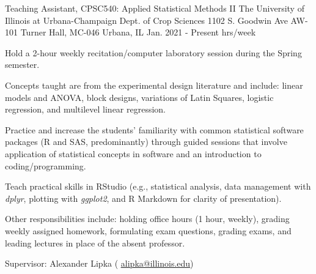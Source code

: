 \begin{cventries}
  \cventry
    {Teaching Assistant, CPSC540: Applied Statistical Methods II} %
    {The University of Illinois at Urbana-Champaign \newline Dept. of Crop Sciences } %
    {1102 S. Goodwin Ave \newline AW-101 Turner Hall, MC-046
    Urbana, IL} %
    {Jan. 2021 - Present  hrs/week} %
    {
      \begin{cvitems} %
        \item {Hold a 2-hour weekly recitation/computer laboratory session during the Spring semester. }
        \item{Concepts taught are from the experimental design literature and include: linear models and ANOVA, block designs, variations of Latin Squares, logistic regression, and multilevel linear regression.}
        \item {Practice and increase the students’ familiarity with common statistical software packages (R and SAS, predominantly) through guided sessions that involve application of statistical concepts in software and an introduction to coding/programming.}
        \item{Teach practical skills in RStudio (e.g., statistical analysis, data management with \textit{dplyr}, plotting with \textit{ggplot2}, and R Markdown for clarity of presentation).}
        \item {Other responsibilities include: holding office hours (1 hour, weekly), grading weekly assigned homework, formulating exam questions, grading exams, and leading lectures in place of the absent professor.}
        \item {Supervisor: Alexander Lipka ( \textcolor{navyblue}{\underline{\href{mailto:alipka@illinois.edu}{alipka@illinois.edu}}})}
      \end{cvitems}
    }



\end{cventries}
